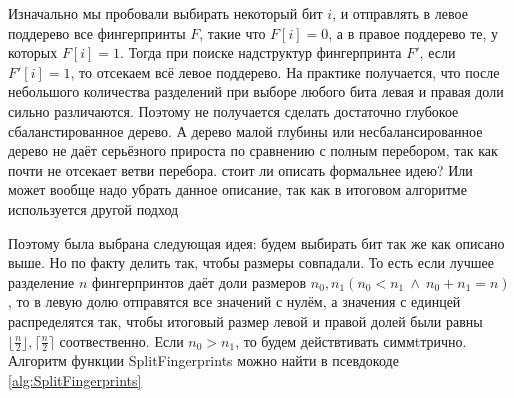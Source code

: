 Изначально мы пробовали выбирать некоторый бит $i$, и отправлять в левое поддерево все фингерпринты $F$, такие что $F[i] = 0$, а в правое поддерево те, у которых $F[i] = 1$. Тогда при поиске надструктур фингерпринта $F'$, если $F'[i] = 1$, то отсекаем всё левое поддерево. 
На практике получается, что после небольшого количества разделений при выборе любого бита левая и правая доли сильно различаются. Поэтому не получается сделать достаточно глубокое сбаланстированное дерево. А дерево малой глубины или несбалансированное дерево не даёт серьёзного прироста по сравнению с полным перебором, так как почти не отсекает ветви перебора. {\color{red} стоит ли описать формальнее идею? Или может вообще надо убрать данное описание, так как в итоговом алгоритме используется другой подход}

Поэтому была выбрана следующая идея: будем выбирать бит так же как описано выше. Но по факту делить так, чтобы размеры совпадали. То есть если лучшее разделение $n $ фингерпринтов даёт доли размеров $n_0, n_1 (n_0 < n_1 \ \land \ n_0 + n_1 = n)$, то в левую долю отправятся все значений с нулём, а значения с единцей распределятся так, чтобы итоговый размер левой и правой долей были равны $\lfloor\frac{n}{2}\rfloor, \lceil \frac{n}{2} \rceil$ соотвественно. Если $n_0 > n_1$, то будем действтивать симмtтрично. Алгоритм функции SplitFingerprints можно найти в псевдокоде \ref{alg:SplitFingerprints}


